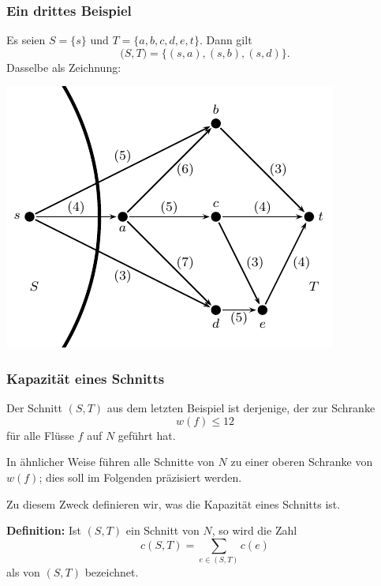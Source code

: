 \documentclass[smaller]{beamer}
\begin{document}
\begin{frame}
 \frametitle{Ein drittes Beispiel}
 Es seien $S = \big\{ s \big\}$ und $T = \big\{ a,b,c,d,e,t \big\}$. Dann gilt 
\[
\big(S,T\big) = \big\{ (s,a), (s,b), (s,d) \big\}.
\]
Dasselbe als Zeichnung:
\begin{center}
 \includegraphics{fig13.pdf}
\end{center}
\end{frame}

\begin{frame}
\frametitle{Kapazität eines Schnitts}
Der Schnitt $(S,T)$ aus dem letzten Beispiel ist derjenige, der zur Schranke
\[
w(f) \leq 12
\]
für alle Flüsse $f$ auf $N$ geführt hat. \\ \vspace*{0.2cm}

In ähnlicher Weise führen alle Schnitte von $N$ zu einer oberen Schranke von $w(f)$; dies soll im Folgenden präzisiert werden. \\ \vspace*{0.2cm}

Zu diesem Zweck definieren wir, was die Kapazität eines Schnitts ist. \\ \vspace*{0.2cm}

\textbf{Definition:} Ist $(S,T)$ ein Schnitt von $N$, so wird die Zahl
\[
c(S,T) = \sum\limits_{e \in (S,T)}{c(e)}
\]
als  von $(S,T)$ bezeichnet.
\end{frame}
\end{document}
